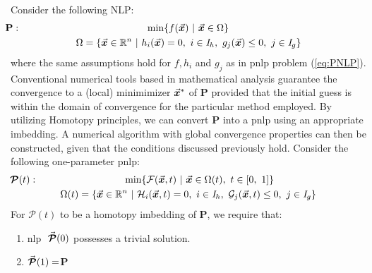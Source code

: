 Consider the following NLP:
\begin{subequations}
	\begin{gather}
		\hspace*{-5.1cm}\textbf{P}: \hspace*{4.5cm}\text{min}\{f(\bvec{x})\ |\
		\bvec{x}\in\Omega\}\label{eq:NLP-P}\\
		\Omega=\{\bvec{x}\in\mathbb{R}^n\ |\ h_i(\bvec{x})=0,\ 
		i\in\mathit{I}_h,\
		g_j(\bvec{x})\leq 0,\ j\in\mathit{I}_g\}\label{eq:NLP-PC}
	\end{gather}
	\label{eq:NLP}
\end{subequations}
\noindent where the same assumptions hold for $f,h_i$ and $g_j$ as in 
\acrshort{pnlp} problem (\ref{eq:PNLP}). Conventional numerical tools based in 
mathematical 
analysis guarantee the convergence to a (local) minimimizer $\vec{\bm{x}}^*$ of
\textbf{P} provided that the initial guess is within the domain of convergence
for the particular method employed. By utilizing Homotopy principles, we can
convert \textbf{P} into a \acrshort{pnlp} using an appropriate imbedding. A 
numerical algorithm with global convergence properties can then be constructed, 
given that the conditions discussed previously hold. Consider the following 
one-parameter \acrshort{pnlp}:
\begin{subequations}
	\begin{gather}
		\hspace*{-3.3cm}\bm{\mathcal{P}}(t):
		\hspace*{3.1cm}\text{min}\{\mathcal{F}(\bvec{x},t)\ |\
		\bvec{x}\in\Omega(t),\ t\in[0,\ 1]\}
		\label{eq:PNLP-P}\\
		\Omega(t)=\{\bvec{x}\in\mathbb{R}^n\ |\ 
		\mathcal{H}_i(\bvec{x},t)=0,\ i\in\mathit{I}_h,\
		\mathcal{G}_j(\bvec{x},t)\leq 0,\ j\in\mathit{I}_g\} \label{eq:PNLP-PC}
	\end{gather}
	\label{eq:PNLPformat}
\end{subequations}
For $\bm{\mathcal{P}}(t)$ to be a homotopy imbedding of \textbf{P}, 
we require that:
\begin{enumerate}
	\item \acrshort{nlp} $\ \vec{\bm{\mathcal{P}}}(0)$ possesses a trivial 
	solution. 
	\item $\vec{\bm{\mathcal{P}}}(1)=$\textbf{P}
\end{enumerate}

